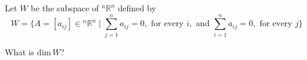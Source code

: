 \documentclass[10pt]{article}
\newcommand{\noin}{\noindent}
\begin{document}
\vspace{0.2in}
{\large 
{} 

\vspace{0.2in}


}

\vfill


\pagebreak


\noin{\bf 1.} Let $W$ be the subspace of ${^n}\mathbb R^n$ defined by
$$W=\{ A=[ a_{ij} ] \in {^n}\mathbb R^n \mid \sum_{j=1}^n a_{ij}=0, \mbox{ for every } i, \mbox{ and } \sum_{i=1}^n a_{ij}=0, \mbox{ for every } j\}$$


\noin What is  $\mathrm{dim}\, W$?


\end{document}
